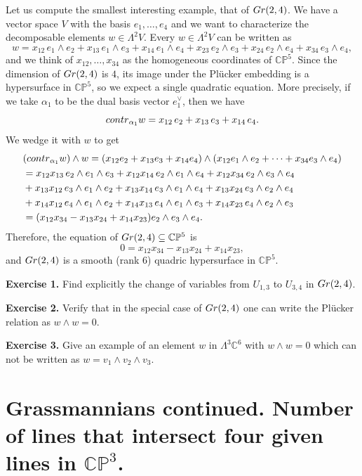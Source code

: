 \documentclass[11pt]{article}
\numberwithin{equation}{section}
\numberwithin{footnote}{section}
\newcommand{\Gr}{{\rm Gr}}
\renewcommand{\P}{{\mathbb P}}
\newcommand{\C}{{\mathbb C}}
\begin{document}
\smallskip
Let us compute the smallest interesting example, that of $\Gr(2,4)$. We have a vector space $V$ with the basis $e_1,\ldots,e_4$ and we want to characterize the decomposable elements $w\in \Lambda^2V$. 
Every $w\in  \Lambda^2V$ can be written as
$$
w = x_{12}  \,e_1 \wedge e_2 +  x_{13}  \,e_1 \wedge e_3 +  x_{14}  \,e_1 \wedge e_4 + x_{23}  \,e_2\wedge e_3 
+ x_{24} \,e_2\wedge e_4 + x_{34} \,e_3\wedge e_4,
$$
and we think of $x_{12},\ldots, x_{34}$ as the homogeneous coordinates of $\C\P^5$. Since the dimension of $\Gr(2,4)$ is $4$, its image under the Pl\"ucker embedding is a hypersurface in $\C\P^5$, so we expect a single quadratic equation.
More precisely, if we take $\alpha_1$ to be the dual basis vector  $e_1^\vee$, then we have 
$$
{\rm contr}_{\alpha_1} w = x_{12} \, e_2 + x_{13}  \,e_3 + x_{14} \, e_4.
$$
We wedge it with $w$ to get 
\begin{align*}
&({\rm contr}_{\alpha_1} w)\wedge w =(x_{12} e_2 + x_{13} e_3 + x_{14} e_4)\wedge (
 x_{12} e_1 \wedge e_2 + \cdots + x_{34}e_3\wedge e_4)\\
 &=
x_{12}x_{13} \,e_2\wedge e_1 \wedge e_3  + x_{12}x_{14} \, e_2 \wedge e_1 \wedge e_4 
+ x_{12}x_{34}  \,e_2\wedge e_3 \wedge e_4 
\\& + x_{13}x_{12} \, e_3 \wedge e_1 \wedge e_2 + x_{13}x_{14} \, e_3 \wedge e_1 \wedge e_4 
+ x_{13}x_{24} \, e_3 \wedge e_2 \wedge e_4 
\\
&+ x_{14}x_{12}  \,e_4 \wedge e_1 \wedge e_2+x_{14}x_{13}  \,e_4 \wedge e_1 \wedge e_3+x_{14}x_{23} \, e_4 \wedge e_2 \wedge e_3
\\
&= (x_{12} x_{34} - x_{13} x_{24} + x_{14} x_{23} ) e_2 \wedge e_3 \wedge e_4.
\end{align*}
Therefore, the equation of $\Gr(2,4)\subseteq \C\P^5$ is
$$
0=x_{12} x_{34} - x_{13} x_{24} + x_{14} x_{23},
$$
and $\Gr(2,4)$ is a smooth (rank $6$) quadric hypersurface in $\C\P^5$.


{\bf Exercise 1.} Find explicitly the change of variables from $U_{1,3}$ to $U_{3,4}$ in $\Gr(2,4)$. 

{\bf Exercise 2.} Verify that in the special case of $\Gr(2,4)$ one can write the Pl\"ucker relation as $w\wedge w=0$.

{\bf Exercise 3.} Give an example of an element $w$ in $\Lambda^3 \C^6$ with $w\wedge w = 0$ which can not be written
as $w=v_1\wedge v_2 \wedge v_3$.

\section{Grassmannians continued. Number of lines that intersect four given lines in $\C\P^3$.}
\end{document}
